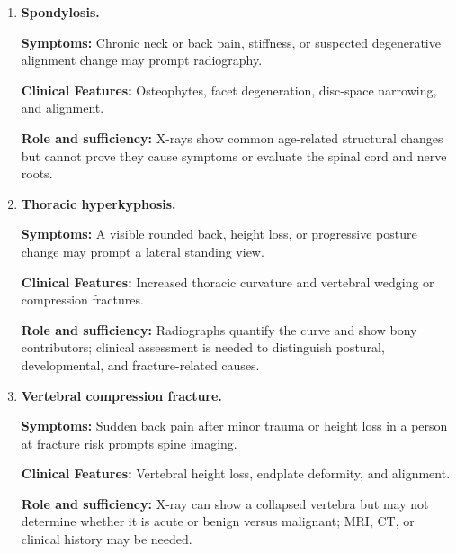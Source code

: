 \begin{enumerate}[leftmargin=*,itemsep=0.45em,topsep=0.4em]
\item \textbf{Spondylosis.}\par\noindent\textbf{Symptoms:} Chronic neck or back pain, stiffness, or suspected degenerative alignment change may prompt radiography.\par\noindent\textbf{Clinical Features:} Osteophytes, facet degeneration, disc-space narrowing, and alignment.\par\noindent\textbf{Role and sufficiency:} X-rays show common age-related structural changes but cannot prove they cause symptoms or evaluate the spinal cord and nerve roots.
\item \textbf{Thoracic hyperkyphosis.}\par\noindent\textbf{Symptoms:} A visible rounded back, height loss, or progressive posture change may prompt a lateral standing view.\par\noindent\textbf{Clinical Features:} Increased thoracic curvature and vertebral wedging or compression fractures.\par\noindent\textbf{Role and sufficiency:} Radiographs quantify the curve and show bony contributors; clinical assessment is needed to distinguish postural, developmental, and fracture-related causes.
\item \textbf{Vertebral compression fracture.}\par\noindent\textbf{Symptoms:} Sudden back pain after minor trauma or height loss in a person at fracture risk prompts spine imaging.\par\noindent\textbf{Clinical Features:} Vertebral height loss, endplate deformity, and alignment.\par\noindent\textbf{Role and sufficiency:} X-ray can show a collapsed vertebra but may not determine whether it is acute or benign versus malignant; MRI, CT, or clinical history may be needed.
\end{enumerate}

